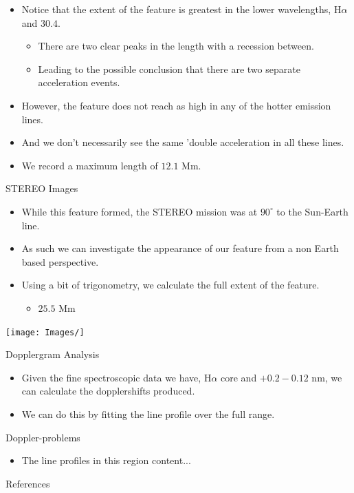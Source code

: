 \documentclass{beamer}
\begin{document}

	\begin{frame}
	\end{frame}


	\begin{frame}
		\begin{itemize}
			\item{Notice that the extent of the feature is greatest in the lower wavelengths, H$\alpha$ and $30.4$.}
			\begin{itemize}
				\item{There are two clear peaks in the length with a recession between.}
				\item{Leading to the possible conclusion that there are two separate acceleration events.}
			\end{itemize}
			\item{However, the feature does not reach as high in any of the hotter emission lines.}
			\item{And we don't necessarily see the same 'double acceleration in all these lines.}
			\item{We record a maximum length of $12.1$ Mm.}
		\end{itemize}
	\end{frame}

	
	\begin{frame}{STEREO Images}
		\begin{itemize}
			\item{While this feature formed, the STEREO mission was at $90^\circ$ to the Sun-Earth line.}
			\item{As such we can investigate the appearance of our feature from a non Earth based perspective.}
			\item{Using a bit of trigonometry, we calculate the full extent of the feature.}
			\begin{itemize}
				\item{$\mathbf{25.5}$ Mm}
			\end{itemize}
		\end{itemize}
		\texttt{[image: Images/]}
	\end{frame}
	
	\begin{frame}{Dopplergram Analysis}
		\begin{itemize}
			\item{Given the fine spectroscopic data we have, H$\alpha$ core and $+0.2 -0.12$ nm, we can calculate the dopplershifts produced.}
			\item{We can do this by fitting the line profile over the full range.}
		\end{itemize}
	\end{frame}
	
	\begin{frame}
		\big {}
	\end{frame}

	\begin{frame}{Doppler-problems}
		\begin{itemize}
			\item{The line profiles in this region }
			content...
		\end{itemize}
	\end{frame}




	\begin{frame}{References}
	\tiny
	
	
	\end{frame}
\end{document}
